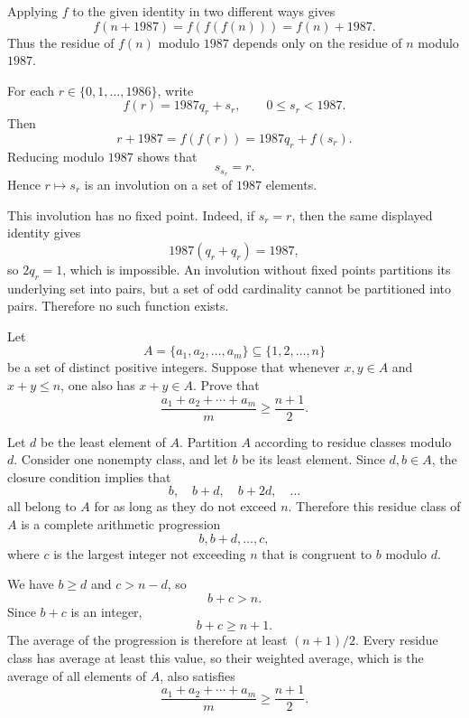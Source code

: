     \begin{solution}
        Applying $f$ to the given identity in two different ways gives
        \[
            f(n+1987)
            =
            f(f(f(n)))
            =
            f(n)+1987.
        \]
        Thus the residue of $f(n)$ modulo $1987$ depends only on the residue of
        $n$ modulo $1987$.

        For each $r\in\{0,1,\ldots,1986\}$, write
        \[
            f(r)=1987q_r+s_r,
            \qquad
            0\leq s_r<1987.
        \]
        Then
        \[
            r+1987
            =
            f(f(r))
            =
            1987q_r+f(s_r).
        \]
        Reducing modulo $1987$ shows that
        \[
            s_{s_r}=r.
        \]
        Hence $r\mapsto s_r$ is an involution on a set of $1987$ elements.

        This involution has no fixed point. Indeed, if $s_r=r$, then the same
        displayed identity gives
        \[
            1987(q_r+q_r)=1987,
        \]
        so $2q_r=1$, which is impossible. An involution without fixed points
        partitions its underlying set into pairs, but a set of odd cardinality
        cannot be partitioned into pairs. Therefore no such function exists.
    \end{solution}

    \begin{expectedproblem}[1994 IMO]
        Let
        \[
            A=\{a_1,a_2,\ldots,a_m\}\subseteq\{1,2,\ldots,n\}
        \]
        be a set of distinct positive integers. Suppose that whenever
        $x,y\in A$ and $x+y\leq n$, one also has $x+y\in A$. Prove that
        \[
            \frac{a_1+a_2+\cdots+a_m}{m}
            \geq
            \frac{n+1}{2}.
        \]
    \end{expectedproblem}

    \begin{solution}
        Let $d$ be the least element of $A$. Partition $A$ according to residue
        classes modulo $d$. Consider one nonempty class, and let $b$ be its
        least element. Since $d,b\in A$, the closure condition implies that
        \[
            b,
            \quad
            b+d,
            \quad
            b+2d,
            \quad\ldots
        \]
        all belong to $A$ for as long as they do not exceed $n$. Therefore this
        residue class of $A$ is a complete arithmetic progression
        \[
            b,b+d,\ldots,c,
        \]
        where $c$ is the largest integer not exceeding $n$ that is congruent to
        $b$ modulo $d$.

        We have $b\geq d$ and $c>n-d$, so
        \[
            b+c>n.
        \]
        Since $b+c$ is an integer,
        \[
            b+c\geq n+1.
        \]
        The average of the progression is therefore at least $(n+1)/2$.
        Every residue class has average at least this value, so their weighted
        average, which is the average of all elements of $A$, also satisfies
        \[
            \boxed{
                \frac{a_1+a_2+\cdots+a_m}{m}
                \geq
                \frac{n+1}{2}
            }.
        \]
    \end{solution}

